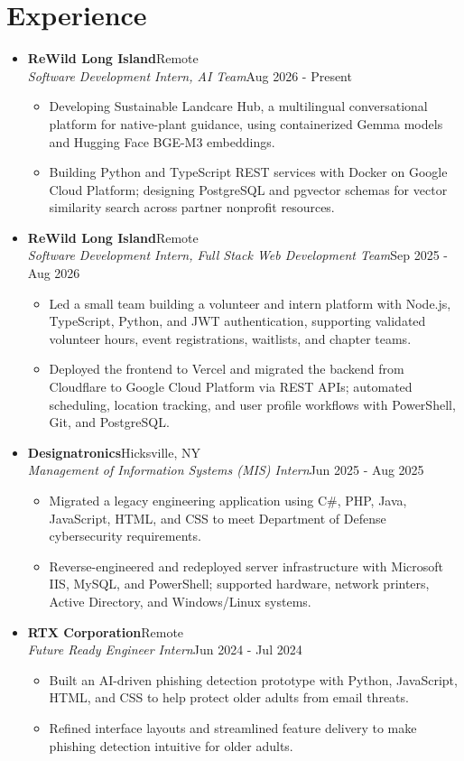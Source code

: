 \documentclass[letterpaper,11pt]{article}
\newcommand{\resumeItem}[1]{
  \item\small{
    {#1}
  }
}
\newcommand{\pdfspace}{\mbox{\textcolor{white}{\char32}}}
\newcommand{\resumeSubheading}[4]{
  \vspace{-2pt}\item
    \textbf{#1}\hfill\pdfspace {\small #2}\\
    {\small\textit{#3}\hfill\pdfspace #4}\par\vspace{-2pt}
}
\newcommand{\resumeSubHeadingListStart}{\begin{itemize}[leftmargin=0.15in,label={},topsep=2pt,itemsep=2pt,parsep=0pt]}
\newcommand{\resumeSubHeadingListEnd}{\end{itemize}}
\newcommand{\resumeItemListStart}{\begin{itemize}[topsep=2pt,itemsep=1pt,parsep=0pt]}
\newcommand{\resumeItemListEnd}{\end{itemize}\vspace{-5pt}}
\begin{document}
\section{Experience}
\resumeSubHeadingListStart
  \resumeSubheading{ReWild Long Island}{Remote}
    {Software Development Intern, AI Team}{Aug 2026 - Present}
    \resumeItemListStart
      \resumeItem{Developing Sustainable Landcare Hub, a multilingual conversational platform for native-plant guidance, using containerized Gemma models and Hugging Face BGE-M3 embeddings.}
      \resumeItem{Building Python and TypeScript REST services with Docker on Google Cloud Platform; designing PostgreSQL and pgvector schemas for vector similarity search across partner nonprofit resources.}
    \resumeItemListEnd
  \resumeSubheading{ReWild Long Island}{Remote}
    {Software Development Intern, Full Stack Web Development Team}{Sep 2025 - Aug 2026}
    \resumeItemListStart
      \resumeItem{Led a small team building a volunteer and intern platform with Node.js, TypeScript, Python, and JWT authentication, supporting validated volunteer hours, event registrations, waitlists, and chapter teams.}
      \resumeItem{Deployed the frontend to Vercel and migrated the backend from Cloudflare to Google Cloud Platform via REST APIs; automated scheduling, location tracking, and user profile workflows with PowerShell, Git, and PostgreSQL.}
    \resumeItemListEnd
  \resumeSubheading{Designatronics}{Hicksville, NY}
    {Management of Information Systems (MIS) Intern}{Jun 2025 - Aug 2025}
    \resumeItemListStart
      \resumeItem{Migrated a legacy engineering application using C\#, PHP, Java, JavaScript, HTML, and CSS to meet Department of Defense cybersecurity requirements.}
      \resumeItem{Reverse-engineered and redeployed server infrastructure with Microsoft IIS, MySQL, and PowerShell; supported hardware, network printers, Active Directory, and Windows/Linux systems.}
    \resumeItemListEnd
  \resumeSubheading{RTX Corporation}{Remote}
    {Future Ready Engineer Intern}{Jun 2024 - Jul 2024}
    \resumeItemListStart
      \resumeItem{Built an AI-driven phishing detection prototype with Python, JavaScript, HTML, and CSS to help protect older adults from email threats.}
      \resumeItem{Refined interface layouts and streamlined feature delivery to make phishing detection intuitive for older adults.}
    \resumeItemListEnd
\resumeSubHeadingListEnd
\end{document}
